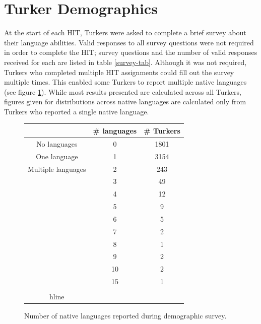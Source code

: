 \documentclass[11pt]{article}
\begin{document}
\section{Turker Demographics}
At the start of each HIT, Turkers were asked to complete a brief survey about their language abilities. Valid responses to all survey questions were not required in order to complete the HIT; survey questions and the number of valid responses received for each are listed in table \ref{survey-tab}. Although it was not required, Turkers who completed multiple HIT assignments could fill out the survey multiple times. This enabled some Turkers to report multiple native languages (see figure \ref{numlangs-tab}). While most results presented are calculated across all Turkers, figures given for distributions across native languages are calculated only from Turkers who reported a single native language.\\

\begin{figure}[h]
\begin{tabular}{ccc}\hline\hline
&\# languages&\# Turkers\\ \hline
No languages&0&1801\\
One language&1&3154\\
Multiple languages&2&243	\\
&3&49\\
&4&12\\
&5&9\\
&6&5\\
&7&2\\
&8&1\\
&9&2\\
&10&2\\
&15&1\\
\hline\\hline
\end{tabular}
\label{numlangs-tab}
\caption{Number of native languages reported during demographic survey.}
\end{figure}
\end{document}
